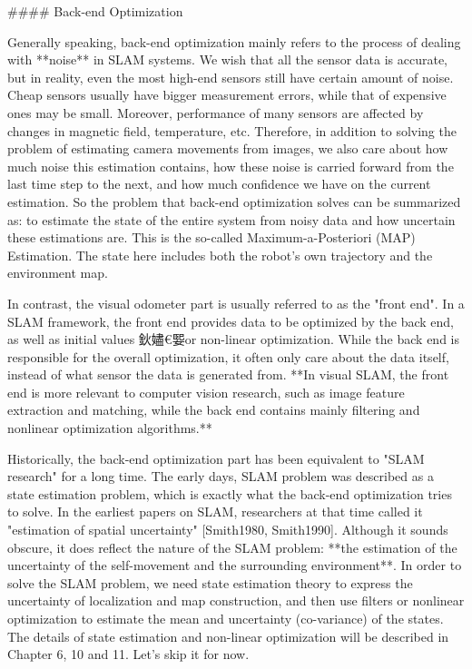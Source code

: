 #### Back-end Optimization

Generally speaking, back-end optimization mainly refers to the process of dealing with **noise** in SLAM systems. We wish that all the sensor data is accurate, but in reality, even the most high-end sensors still have certain amount of noise. Cheap sensors usually have bigger measurement errors, while that of expensive ones may be small. Moreover, performance of many sensors are affected by changes in magnetic field, temperature, etc. Therefore, in addition to solving the problem of estimating camera movements from images, we also care about how much noise this estimation contains, how these noise is carried forward from the last time step to the next, and how much confidence we have on the current estimation. So the problem that back-end optimization solves can be summarized as: to estimate the state of the entire system from noisy data and how uncertain these estimations are. This is the so-called Maximum-a-Posteriori (MAP) Estimation. The state here includes both the robot's own trajectory and the environment map.

In contrast, the visual odometer part is usually referred to as the "front end". In a SLAM framework, the front end provides data to be optimized by the back end, as well as initial values 鈥嬧€媐or non-linear optimization. While the back end is responsible for the overall optimization, it often only care about the data itself, instead of what sensor the data is generated from. **In visual SLAM, the front end is more relevant to computer vision research, such as image feature extraction and matching, while the back end contains mainly filtering and nonlinear optimization algorithms.**

Historically, the back-end optimization part has been equivalent to "SLAM research" for a long time. The early days, SLAM problem was described as a state estimation problem, which is exactly what the back-end optimization tries to solve. In the earliest papers on SLAM, researchers at that time called it "estimation of spatial uncertainty" [Smith1980, Smith1990]. Although it sounds obscure, it does reflect the nature of the SLAM problem: **the estimation of the uncertainty of the self-movement and the surrounding environment**. In order to solve the SLAM problem, we need state estimation theory to express the uncertainty of localization and map construction, and then use filters or nonlinear optimization to estimate the mean and uncertainty (co-variance) of the states. The details of state estimation and non-linear optimization will be described in Chapter 6, 10 and 11. Let's skip it for now.

